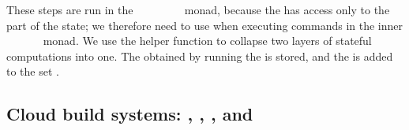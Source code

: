 These steps are run in the
~~~~~~~~
monad, because the  has access only to the~ part of the state;
we therefore need to use  when executing commands in the inner
~~~~~~ monad.
We use the helper function  to collapse two layers of stateful
computations into one. The  obtained by running the  is
stored, and the  is added to the set .

\subsection{Cloud build systems: \Bazel, \CloudBuild, \Cloud \Shake, \Buck and \Nix}\label{sec-implementation-cloud}

